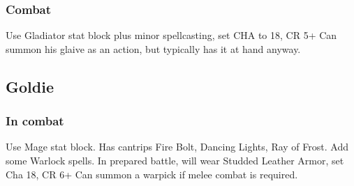 \subsubsection{Combat}
Use Gladiator stat block plus minor spellcasting, set CHA to 18, CR 5+
Can summon his glaive as an action, but typically has it at hand anyway.

\subsection{Goldie}\label{subsec:goldie}

\subsubsection{In combat}

Use Mage stat block.
Has cantrips Fire Bolt, Dancing Lights, Ray of Frost.
Add some Warlock spells.
In prepared battle, will wear Studded Leather Armor, set Cha 18, CR 6+
Can summon a warpick if melee combat is required.

